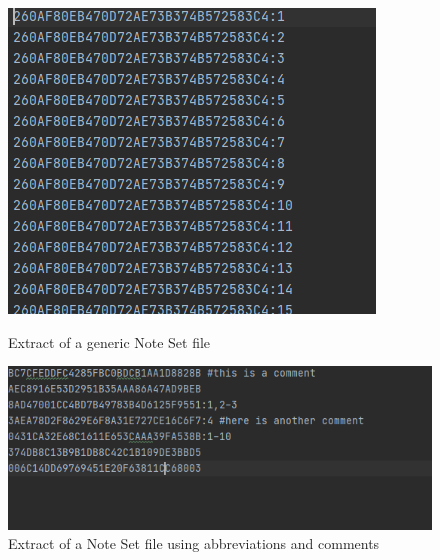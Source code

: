 \begin{figure}[!htb]
  \includegraphics[width=\linewidth]{images/notesetpicture1sm.png}
  \caption{Extract of a generic Note Set file}\label{fig:ns_example_1}
\endminipage\hfill
{}
  \includegraphics[width=\linewidth]{images/notesetpicture2.png}
  \caption{Extract of a Note Set file using abbreviations and comments}\label{fig:ns_example_2}
\endminipage\hfill
\end{figure}

